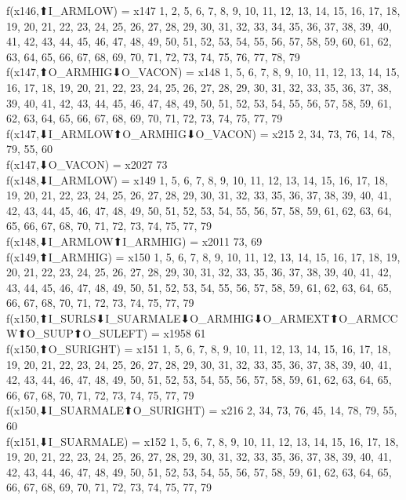 f(x146,⬆I_ARMLOW) = x147 {1, 2, 5, 6, 7, 8, 9, 10, 11, 12, 13, 14, 15, 16, 17, 18, 19, 20, 21, 22, 23, 24, 25, 26, 27, 28, 29, 30, 31, 32, 33, 34, 35, 36, 37, 38, 39, 40, 41, 42, 43, 44, 45, 46, 47, 48, 49, 50, 51, 52, 53, 54, 55, 56, 57, 58, 59, 60, 61, 62, 63, 64, 65, 66, 67, 68, 69, 70, 71, 72, 73, 74, 75, 76, 77, 78, 79} \\
f(x147,⬆O_ARMHIG⬇O_VACON) = x148 {1, 5, 6, 7, 8, 9, 10, 11, 12, 13, 14, 15, 16, 17, 18, 19, 20, 21, 22, 23, 24, 25, 26, 27, 28, 29, 30, 31, 32, 33, 35, 36, 37, 38, 39, 40, 41, 42, 43, 44, 45, 46, 47, 48, 49, 50, 51, 52, 53, 54, 55, 56, 57, 58, 59, 61, 62, 63, 64, 65, 66, 67, 68, 69, 70, 71, 72, 73, 74, 75, 77, 79} \\
f(x147,⬇I_ARMLOW⬆O_ARMHIG⬇O_VACON) = x215 {2, 34, 73, 76, 14, 78, 79, 55, 60} \\
f(x147,⬇O_VACON) = x2027 {73} \\
f(x148,⬇I_ARMLOW) = x149 {1, 5, 6, 7, 8, 9, 10, 11, 12, 13, 14, 15, 16, 17, 18, 19, 20, 21, 22, 23, 24, 25, 26, 27, 28, 29, 30, 31, 32, 33, 35, 36, 37, 38, 39, 40, 41, 42, 43, 44, 45, 46, 47, 48, 49, 50, 51, 52, 53, 54, 55, 56, 57, 58, 59, 61, 62, 63, 64, 65, 66, 67, 68, 70, 71, 72, 73, 74, 75, 77, 79} \\
f(x148,⬇I_ARMLOW⬆I_ARMHIG) = x2011 {73, 69} \\
f(x149,⬆I_ARMHIG) = x150 {1, 5, 6, 7, 8, 9, 10, 11, 12, 13, 14, 15, 16, 17, 18, 19, 20, 21, 22, 23, 24, 25, 26, 27, 28, 29, 30, 31, 32, 33, 35, 36, 37, 38, 39, 40, 41, 42, 43, 44, 45, 46, 47, 48, 49, 50, 51, 52, 53, 54, 55, 56, 57, 58, 59, 61, 62, 63, 64, 65, 66, 67, 68, 70, 71, 72, 73, 74, 75, 77, 79} \\
f(x150,⬆I_SURLS⬇I_SUARMALE⬇O_ARMHIG⬇O_ARMEXT⬆O_ARMCCW⬆O_SUUP⬆O_SULEFT) = x1958 {61} \\
f(x150,⬆O_SURIGHT) = x151 {1, 5, 6, 7, 8, 9, 10, 11, 12, 13, 14, 15, 16, 17, 18, 19, 20, 21, 22, 23, 24, 25, 26, 27, 28, 29, 30, 31, 32, 33, 35, 36, 37, 38, 39, 40, 41, 42, 43, 44, 46, 47, 48, 49, 50, 51, 52, 53, 54, 55, 56, 57, 58, 59, 61, 62, 63, 64, 65, 66, 67, 68, 70, 71, 72, 73, 74, 75, 77, 79} \\
f(x150,⬇I_SUARMALE⬆O_SURIGHT) = x216 {2, 34, 73, 76, 45, 14, 78, 79, 55, 60} \\
f(x151,⬇I_SUARMALE) = x152 {1, 5, 6, 7, 8, 9, 10, 11, 12, 13, 14, 15, 16, 17, 18, 19, 20, 21, 22, 23, 24, 25, 26, 27, 28, 29, 30, 31, 32, 33, 35, 36, 37, 38, 39, 40, 41, 42, 43, 44, 46, 47, 48, 49, 50, 51, 52, 53, 54, 55, 56, 57, 58, 59, 61, 62, 63, 64, 65, 66, 67, 68, 69, 70, 71, 72, 73, 74, 75, 77, 79} \\
